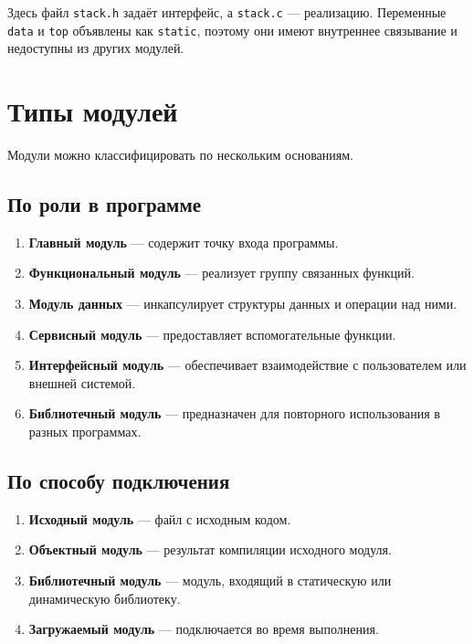 \documentclass[12pt,a4paper]{article}
\begin{document}
Здесь файл \texttt{stack.h} задаёт интерфейс, а \texttt{stack.c} --- реализацию. Переменные \texttt{data} и \texttt{top} объявлены как \texttt{static}, поэтому они имеют внутреннее связывание и недоступны из других модулей.

\section{Типы модулей}

Модули можно классифицировать по нескольким основаниям.

\subsection{По роли в программе}

\begin{enumerate}
  \item \textbf{Главный модуль} --- содержит точку входа программы.
  \item \textbf{Функциональный модуль} --- реализует группу связанных функций.
  \item \textbf{Модуль данных} --- инкапсулирует структуры данных и операции над ними.
  \item \textbf{Сервисный модуль} --- предоставляет вспомогательные функции.
  \item \textbf{Интерфейсный модуль} --- обеспечивает взаимодействие с пользователем или внешней системой.
  \item \textbf{Библиотечный модуль} --- предназначен для повторного использования в разных программах.
\end{enumerate}

\subsection{По способу подключения}

\begin{enumerate}
  \item \textbf{Исходный модуль} --- файл с исходным кодом.
  \item \textbf{Объектный модуль} --- результат компиляции исходного модуля.
  \item \textbf{Библиотечный модуль} --- модуль, входящий в статическую или динамическую библиотеку.
  \item \textbf{Загружаемый модуль} --- подключается во время выполнения.
\end{enumerate}
\end{document}
